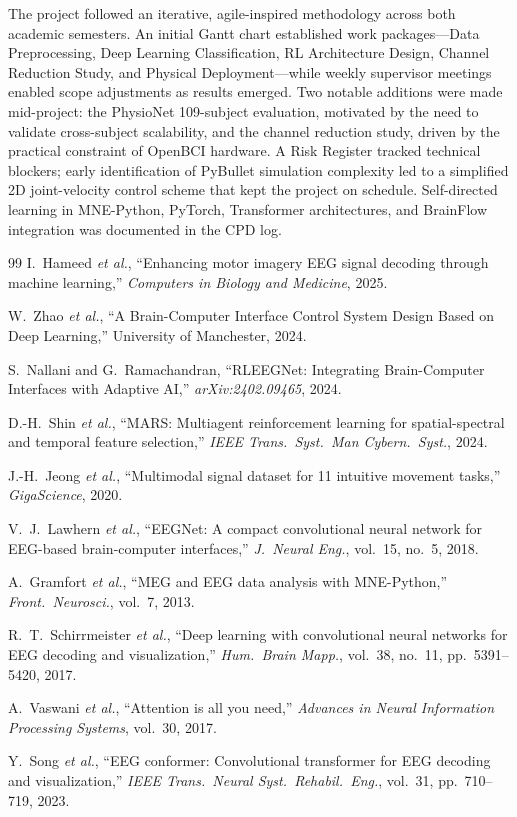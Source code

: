 \documentclass[12pt, a4paper]{article}
\begin{document}
The project followed an iterative, agile-inspired methodology across both academic semesters. An initial Gantt chart established work packages---Data Preprocessing, Deep Learning Classification, RL Architecture Design, Channel Reduction Study, and Physical Deployment---while weekly supervisor meetings enabled scope adjustments as results emerged. Two notable additions were made mid-project: the PhysioNet 109-subject evaluation, motivated by the need to validate cross-subject scalability, and the channel reduction study, driven by the practical constraint of OpenBCI hardware. A Risk Register tracked technical blockers; early identification of PyBullet simulation complexity led to a simplified 2D joint-velocity control scheme that kept the project on schedule. Self-directed learning in MNE-Python, PyTorch, Transformer architectures, and BrainFlow integration was documented in the CPD log.

\begin{thebibliography}{99}
I.~Hameed \emph{et al.}, ``Enhancing motor imagery EEG signal decoding through machine learning,'' \textit{Computers in Biology and Medicine}, 2025.

W.~Zhao \emph{et al.}, ``A Brain-Computer Interface Control System Design Based on Deep Learning,'' University of Manchester, 2024.

S.~Nallani and G.~Ramachandran, ``RLEEGNet: Integrating Brain-Computer Interfaces with Adaptive AI,'' \textit{arXiv:2402.09465}, 2024.

D.-H.~Shin \emph{et al.}, ``MARS: Multiagent reinforcement learning for spatial-spectral and temporal feature selection,'' \textit{IEEE Trans.\ Syst.\ Man Cybern.\ Syst.}, 2024.

J.-H.~Jeong \emph{et al.}, ``Multimodal signal dataset for 11 intuitive movement tasks,'' \textit{GigaScience}, 2020.

V.~J.~Lawhern \emph{et al.}, ``EEGNet: A compact convolutional neural network for EEG-based brain-computer interfaces,'' \textit{J.\ Neural Eng.}, vol.~15, no.~5, 2018.

A.~Gramfort \emph{et al.}, ``MEG and EEG data analysis with MNE-Python,'' \textit{Front.\ Neurosci.}, vol.~7, 2013.

R.~T.~Schirrmeister \emph{et al.}, ``Deep learning with convolutional neural networks for EEG decoding and visualization,'' \textit{Hum.\ Brain Mapp.}, vol.~38, no.~11, pp.~5391--5420, 2017.

A.~Vaswani \emph{et al.}, ``Attention is all you need,'' \textit{Advances in Neural Information Processing Systems}, vol.~30, 2017.

Y.~Song \emph{et al.}, ``EEG conformer: Convolutional transformer for EEG decoding and visualization,'' \textit{IEEE Trans.\ Neural Syst.\ Rehabil.\ Eng.}, vol.~31, pp.~710--719, 2023.
\end{thebibliography}
\end{document}
